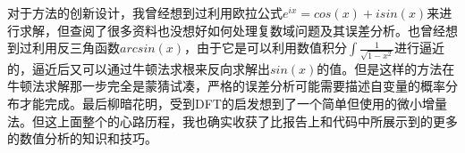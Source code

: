 \documentclass[UTF8]{ctexart}
\begin{document}
对于方法的创新设计，我曾经想到过利用欧拉公式$e^{ix} = cos(x)+isin(x)$来进行求解，但查阅了很多资料也没想好如何处理复数域问题及其误差分析。也曾经想到过利用反三角函数$arcsin(x)$，由于它是可以利用数值积分$\int\frac{1}{\sqrt{1-x^2}}$进行逼近的，逼近后又可以通过牛顿法求根来反向求解出$sin(x)$的值。但是这样的方法在牛顿法求解那一步完全是蒙猜试凑，严格的误差分析可能需要描述自变量的概率分布才能完成。最后柳暗花明，受到DFT的启发想到了一个简单但使用的微小增量法。但这上面整个的心路历程，我也确实收获了比报告上和代码中所展示到的更多的数值分析的知识和技巧。
\end{document}
